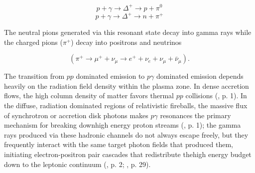 \documentclass{aa} %
\begin{document}
\begin{equation}
  p + \gamma \rightarrow \Delta^+ \rightarrow p + \pi^0
\end{equation}
\begin{equation}
  p + \gamma \rightarrow \Delta^+ \rightarrow n + \pi^+
\end{equation}

The neutral pions generated via this resonant state decay into gamma rays while the charged pions ($\pi^+$) decay into positrons and neutrinos 

\begin{equation}
    (\pi^+ \rightarrow \mu^+ + \nu_\mu \rightarrow e^+ + \nu_e + \nu_\mu + \bar{\nu}_\mu).
\end{equation}

The transition from $pp$ dominated emission to $p\gamma$ dominated emission depends heavily on the radiation field density within the plasma zone. In dense accretion flows, the high column density of matter favors thermal $pp$ collisions (\citet{Kafexhiuetal2019}, p. 1). In the diffuse, radiation dominated regions of relativistic fireballs, the massive flux of synchrotron or accretion disk photons makes $p\gamma$ resonances the primary mechanism for breaking downhigh energy proton streams (\citet{Boettcheretal1996}, p. 1); the gamma rays produced via these hadronic channels do not always escape freely, but they frequently interact with the same target photon fields that produced them, initiating electron-positron pair cascades that redistribute thehigh energy budget down to the leptonic continuum (\citet{Boettcheretal1996}, p. 2; \citet{KumarandZhang2015}, p. 29).
\end{document}

